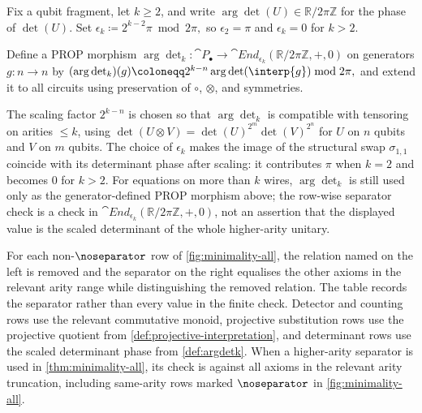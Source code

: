 \begin{definition}\label{def:argdetk}
Fix a qubit fragment, let \(k\ge 2\), and write \(\arg\det(U)\in\mathbb{R}/2\pi\mathbb{Z}\) for the
phase of \(\det(U)\).  Set
\(
  \epsilon_k\coloneqq 2^{k-2}\pi \bmod 2\pi,
\)
so \(\epsilon_2=\pi\) and \(\epsilon_k=0\) for \(k>2\).

Define a PROP morphism
\(
  \arg\det_k:\cat{P}_\bullet\to \cat{End}_{\epsilon_k}(\mathbb{R}/2\pi\mathbb{Z},+,0)
\)
on generators \(g:n\to n\) by
\(
  (\arg\det_k)(g)\coloneqq 2^{k-n}\arg\det(\interp{g}) \bmod 2\pi,
\)
and extend it to all circuits using preservation of \(\circ\), \(\otimes\), and symmetries.
\end{definition}

\begin{remark}
The scaling factor \(2^{k-n}\) is chosen so that \(\arg\det_k\) is compatible with tensoring on
arities \(\le k\), using \(\det(U\otimes V)=\det(U)^{2^m}\det(V)^{2^n}\) for \(U\) on \(n\) qubits and \(V\)
on \(m\) qubits.  The choice of \(\epsilon_k\) makes the image of the structural swap
\(\sigma_{1,1}\) coincide with its determinant phase after scaling: it contributes \(\pi\) when \(k=2\)
and becomes \(0\) for \(k>2\).
For equations on more than \(k\) wires, \(\arg\det_k\) is still used only as the generator-defined
PROP morphism above; the row-wise separator check is a check in
\(\cat{End}_{\epsilon_k}(\mathbb{R}/2\pi\mathbb{Z},+,0)\), not an assertion that the displayed
value is the scaled determinant of the whole higher-arity unitary.
\end{remark}

For each non-\(\noseparator\) row of \cref{fig:minimality-all}, the relation named on the left is
removed and the separator on the right equalises the other axioms in the relevant arity range while
distinguishing the removed relation.  The table records the separator rather than every value in the
finite check.  Detector and counting rows use the relevant commutative monoid,
projective substitution rows use the projective quotient from \cref{def:projective-interpretation},
and determinant rows use the scaled determinant phase from \cref{def:argdetk}.  When a higher-arity
separator is used in \cref{thm:minimality-all}, its check is against all axioms in the relevant arity
truncation, including same-arity rows marked \(\noseparator\) in \cref{fig:minimality-all}.

